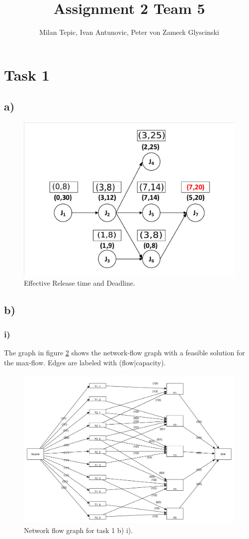 \documentclass[10pt,a4paper]{article}
\author{Milan Tepic, Ivan Antunovic, Peter von Zameck Glyscinski}
\title{Assignment 2 Team 5}
\begin{document}
\maketitle
\section*{Task 1}
\subsection*{a)}
\begin{figure}[h]
\includegraphics[width=\linewidth]{1a.pdf}
\caption{Effective Release time and Deadline.} 
\label{fig:1a}
\end{figure}
\newpage
\subsection*{b)}
\subsubsection*{i)}
The graph in figure \ref{fig:1bi} shows the network-flow graph with a feasible solution for the max-flow.
Edges are labeled with (flow|capacity).

\begin{figure}[h]
\includegraphics[width=\linewidth]{maxflow_1b.pdf}
\caption{Network flow graph for task 1 b) i).}
\label{fig:1bi}
\end{figure}
\end{document}
